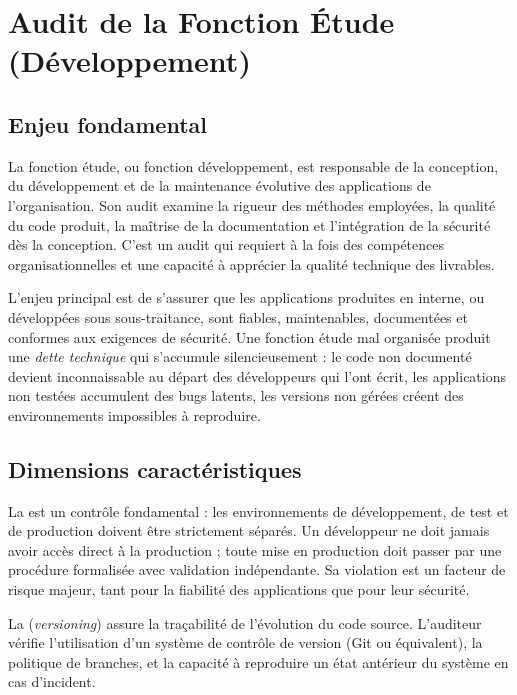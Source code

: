 \section{Audit de la Fonction Étude (Développement)}

\subsection{Enjeu fondamental}

La fonction étude, ou fonction développement, est responsable de la conception, du développement et de la maintenance évolutive des applications de l'organisation. Son audit examine la rigueur des méthodes employées, la qualité du code produit, la maîtrise de la documentation et l'intégration de la sécurité dès la conception. C'est un audit qui requiert à la fois des compétences organisationnelles et une capacité à apprécier la qualité technique des livrables.

L'enjeu principal est de s'assurer que les applications produites en interne, ou développées sous sous-traitance, sont fiables, maintenables, documentées et conformes aux exigences de sécurité. Une fonction étude mal organisée produit une \textit{dette technique} qui s'accumule silencieusement : le code non documenté devient inconnaissable au départ des développeurs qui l'ont écrit, les applications non testées accumulent des bugs latents, les versions non gérées créent des environnements impossibles à reproduire.

\subsection{Dimensions caractéristiques}

La  est un contrôle fondamental : les environnements de développement, de test et de production doivent être strictement séparés. Un développeur ne doit jamais avoir accès direct à la production ; toute mise en production doit passer par une procédure formalisée avec validation indépendante. Sa violation est un facteur de risque majeur, tant pour la fiabilité des applications que pour leur sécurité.

La  (\textit{versioning}) assure la traçabilité de l'évolution du code source. L'auditeur vérifie l'utilisation d'un système de contrôle de version (Git ou équivalent), la politique de branches, et la capacité à reproduire un état antérieur du système en cas d'incident.

